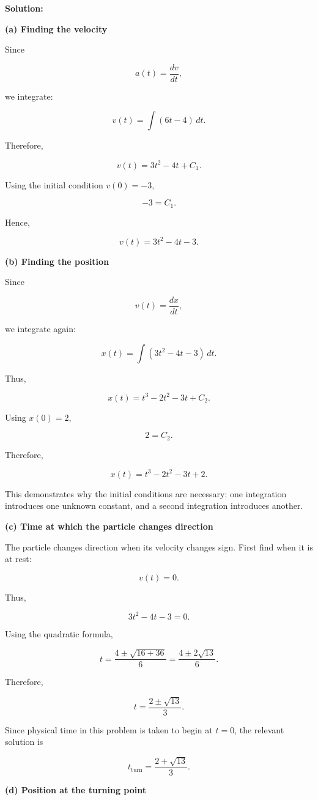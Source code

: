 \documentclass[12pt]{article}
\theoremstyle{remark}
\begin{document}
\textbf{Solution:}

\textbf{(a) Finding the velocity}

Since

\[
a(t)=\frac{dv}{dt},
\]

we integrate:

\[
v(t)=\int (6t-4)\,dt.
\]

Therefore,

\[
v(t)=3t^2-4t+C_1.
\]

Using the initial condition \(v(0)=-3\),

\[
-3=C_1.
\]

Hence,

\[
\boxed{
v(t)=3t^2-4t-3.
}
\]

\textbf{(b) Finding the position}

Since

\[
v(t)=\frac{dx}{dt},
\]

we integrate again:

\[
x(t)
=
\int (3t^2-4t-3)\,dt.
\]

Thus,

\[
x(t)=t^3-2t^2-3t+C_2.
\]

Using \(x(0)=2\),

\[
2=C_2.
\]

Therefore,

\[
\boxed{
x(t)=t^3-2t^2-3t+2.
}
\]

This demonstrates why the initial conditions are necessary: one integration introduces one unknown constant, and a second integration introduces another.

\textbf{(c) Time at which the particle changes direction}

The particle changes direction when its velocity changes sign. First find when it is at rest:

\[
v(t)=0.
\]

Thus,

\[
3t^2-4t-3=0.
\]

Using the quadratic formula,

\[
t
=
\frac{4\pm\sqrt{16+36}}{6}
=
\frac{4\pm2\sqrt{13}}{6}.
\]

Therefore,

\[
t=\frac{2\pm\sqrt{13}}{3}.
\]

Since physical time in this problem is taken to begin at \(t=0\), the relevant solution is

\[
\boxed{
t_{\mathrm{turn}}
=
\frac{2+\sqrt{13}}{3}.
}
\]

\textbf{(d) Position at the turning point}
\end{document}
